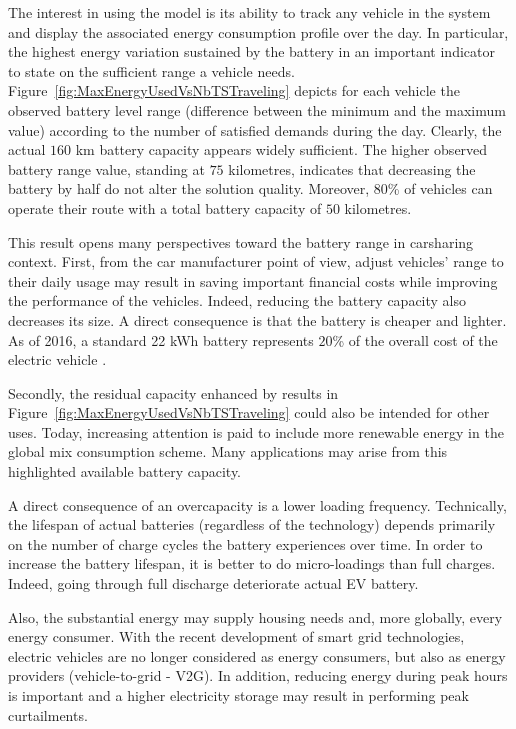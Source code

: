 \begin{bibunit}[ieeetr]
\bigskip
The interest in using the {\ENERGY} model is its ability to track any vehicle in the system and display the associated energy consumption profile over the day.
In particular, the highest energy variation sustained by the battery in an important indicator to state on the sufficient range a vehicle needs.
Figure~\ref{fig:MaxEnergyUsedVsNbTSTraveling} depicts for each vehicle the observed battery level range (difference between the minimum and the maximum value) according to the number of satisfied demands during the day.
Clearly, the actual $160$ km battery capacity appears widely sufficient.
The higher observed battery range value, standing at $75$ kilometres, indicates that decreasing the battery by half do not alter the solution quality.
Moreover, $80$\% of vehicles can operate their route with a total battery capacity of $50$ kilometres.

\medskip
This result opens many perspectives toward the battery range in carsharing context.
First, from the car manufacturer point of view, adjust vehicles' range to their daily usage may result in saving important financial costs while improving the performance of the vehicles.
Indeed, reducing the battery capacity also decreases its size.
A direct consequence is that the battery is cheaper and lighter.
As of 2016, a standard 22 kWh battery represents $20$\% of the overall cost of the electric vehicle \cite{avem_prixEVs}.

Secondly, the residual capacity enhanced by results in Figure~\ref{fig:MaxEnergyUsedVsNbTSTraveling} could also be intended for other uses.
Today, increasing attention is paid to include more renewable energy in the global mix consumption  scheme.
Many applications may arise from this highlighted available battery capacity.

A direct consequence of an overcapacity is a lower loading frequency.
Technically, the lifespan of actual batteries (regardless of the technology) depends primarily on the number of charge cycles the battery experiences over time.
In order to increase the battery lifespan, it is better to do micro-loadings than full charges.
Indeed, going through full discharge deteriorate actual EV battery.

Also, the substantial energy may supply housing needs and, more globally, every energy consumer.
With the recent development of smart grid technologies, electric vehicles are no longer considered as energy consumers, but also as energy providers (\see vehicle-to-grid - V2G).
In addition, reducing energy during peak hours is important and a higher electricity storage may result in performing peak curtailments.


\end{bibunit}
